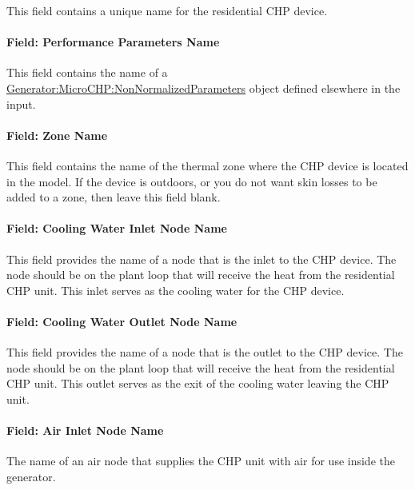 This field contains a unique name for the residential CHP device.

\paragraph{Field: Performance Parameters Name}\label{field-performance-parameters-name}

This field contains the name of a \hyperref[generatormicrochpnonnormalizedparameters]{Generator:MicroCHP:NonNormalizedParameters} object defined elsewhere in the input.

\paragraph{Field: Zone Name}\label{field-zone-name-7-000}

This field contains the name of the thermal zone where the CHP device is located in the model. If the device is outdoors, or you do not want skin losses to be added to a zone, then leave this field blank.

\paragraph{Field: Cooling Water Inlet Node Name}\label{field-cooling-water-inlet-node-name}

This field provides the name of a node that is the inlet to the CHP device. The node should be on the plant loop that will receive the heat from the residential CHP unit. This inlet serves as the cooling water for the CHP device.

\paragraph{Field: Cooling Water Outlet Node Name}\label{field-cooling-water-outlet-node-name}

This field provides the name of a node that is the outlet to the CHP device. The node should be on the plant loop that will receive the heat from the residential CHP unit. This outlet serves as the exit of the cooling water leaving the CHP unit.

\paragraph{Field: Air Inlet Node Name}\label{field-air-inlet-node-name-000}

The name of an air node that supplies the CHP unit with air for use inside the generator.

